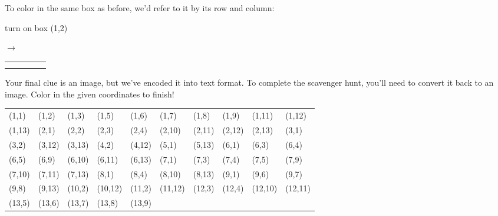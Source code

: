 \documentclass{article}
\begin{document}

To color in the same box as before, we'd refer to it by its row and column: 

\begin{minipage}[c]{.4\linewidth}
\center
turn on box (1,2) 
\end{minipage}
\begin{minipage}[c]{.2\linewidth} $\rightarrow$ \end{minipage}
\begin{minipage}[c]{.4\linewidth}
\center
\begin{tabular}{*{5}{|c}|}
\hline
 &  & & & \\ \hline
 & & & & \\ \hline
 & & & & \\ \hline
\end{tabular}
\end{minipage}

Your final clue is an image, but we've encoded it into text format. To complete the scavenger hunt, you'll need to convert it back to an image. Color in the given coordinates to finish!

\newpage

\begin{tabular}{|*{10}{l}|}
\hline
(1,1) & (1,2) & (1,3) & (1,5) & (1,6) & (1,7) & (1,8) & (1,9) & (1,11) & (1,12) \\
(1,13) & (2,1) & (2,2) & (2,3) & (2,4) & (2,10) & (2,11) & (2,12) & (2,13) & (3,1) \\
(3,2) & (3,12) & (3,13) & (4,2) & (4,12) & (5,1) & (5,13) & (6,1) & (6,3) &
(6,4) \\
(6,5) & (6,9) & (6,10) & (6,11) & (6,13) & (7,1) & (7,3) & (7,4) & (7,5) & (7,9) \\
(7,10) & (7,11) & (7,13) & (8,1) & (8,4) & (8,10) & (8,13) & (9,1) & (9,6) &
(9,7) \\
(9,8) & (9,13) & (10,2) & (10,12) & (11,2) & (11,12) & (12,3) & (12,4) & (12,10) & (12,11) \\
(13,5) & (13,6) & (13,7) & (13,8) & (13,9) & & & & & \\
\hline
\end{tabular}

\vspace{1cm}

\end{document}
